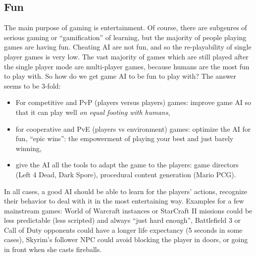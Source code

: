 \subsection{Fun}
The main purpose of gaming is entertainment. Of course, there are subgenres of serious gaming or ``gamification'' of learning, but the majority of people playing games are having fun. Cheating AI are not fun, and so the re-playability of single player games is very low. The vast majority of games which are still played after the single player mode are multi-player games, because humans are the most fun to play with. So how do we get game AI to be fun to play with? The answer seems to be 3-fold:
\begin{itemize}
\item For competitive and PvP
(players versus players) games: improve game AI so that it can play well \textit{on equal footing with humans},
\item for cooperative and PvE
(players vs environment) games: optimize the AI for fun, ``epic wins'': the empowerment of playing your best and just barely winning,
\item give the AI all the tools to adapt the game to the players: game directors (Left 4 Dead, Dark Spore), procedural content generation (Mario PCG).
\end{itemize}
In all cases, a good AI should be able to learn for the players' actions, recognize their behavior to deal with it in the most entertaining way. Examples for a few mainstream games: World of Warcraft instances or StarCraft II missions could be less predictable (less scripted) and always ``just hard enough'', Battlefield 3 or Call of Duty opponents could have a longer life expectancy (5 seconds in some cases), Skyrim's follower NPC could avoid blocking the player in doors, or going in front when she casts fireballs.

